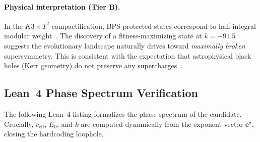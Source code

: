 \documentclass[11pt,a4paper]{article}
\theoremstyle{plain}
\theoremstyle{definition}
\theoremstyle{remark}
\newcommand{\tierB}{\textbf{Tier B}}
\begin{document}
\paragraph{Physical interpretation (\tierB{}).}
In the $K3 \times T^2$ compactification, BPS-protected states correspond
to half-integral modular weight~\cite{EOT2011, GPPV2020}. The discovery
of a fitness-maximizing state at $k = -91.5$ suggests the evolutionary
landscape naturally drives toward \emph{maximally broken} supersymmetry.
This is consistent with the expectation that astrophysical black holes
(Kerr geometry) do not preserve any supercharges~\cite{Sen2012}.

\subsection{Lean~4 Phase Spectrum Verification}

The following Lean~4 listing formalizes the phase spectrum of the candidate.
Crucially, $c_{\mathrm{eff}}$, $E_0$, and $k$ are computed dynamically from the
exponent vector $\mathbf{e}^\star$, closing the hardcoding loophole.
\end{document}
